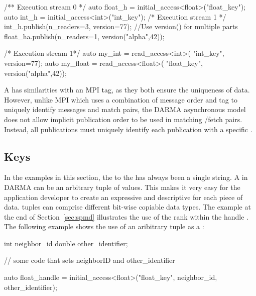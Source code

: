 \begin{minipage}{0.5\textwidth}
\begin{CppCode}
/** Execution stream 0 */
auto float_h =
  initial_access<float>("float_key");
auto int_h =
  initial_access<int>("int_key");
/* Execution stream 1 */
int_h.publish(n_readers=3, version=77);
//Use version() for multiple parts
float_ha.publish(n_readers=1, 
    version("alpha",42));
\end{CppCode}
\end{minipage}
\begin{minipage}{0.45\textwidth}
\begin{CppCode}
/* Execution stream 1*/
auto my_int =  read_access<int>(
  "int_key", version=77);
auto my_float = read_access<float>(
  "float_key", version("alpha",42));
\end{CppCode}
\end{minipage}

A  has similarities with an MPI tag, as they both ensure the uniqueness of data.
However, unlike MPI which uses a combination of message order and tag to
uniquely identify messages and match  pairs,
the \gls{DARMA} asynchronous model does not allow implicit publication order to
be used in matching /\gls{fetch} pairs.
Instead, all publications must uniquely identify each publication with a
specific .


\subsection{Keys}
\label{subsec:keys}
In the examples in this section, the  to the
\ahandleT has always been a single string. 
A  in \gls{DARMA} 
can be an arbitrary \gls{tuple} of values.  This 
makes it very easy for the application developer to create an expressive
and descriptive  for each piece of data.  \Glspl{tuple} can comprise
different bit-wise copiable data types.  The example at the end of
Section~\ref{sec:spmd} illustrates the use of the \gls{rank} within the
\gls{handle} .  The following example shows the use of an
aribitrary \gls{tuple} as a :
\begin{CppCode}
  int neighbor_id
  double other_identifier;

  // some code that sets neighborID and other_identifier
  
  auto float_handle = initial_access<float>("float_key", 
                                            neighbor_id, 
                                            other_identifier);
\end{CppCode}

